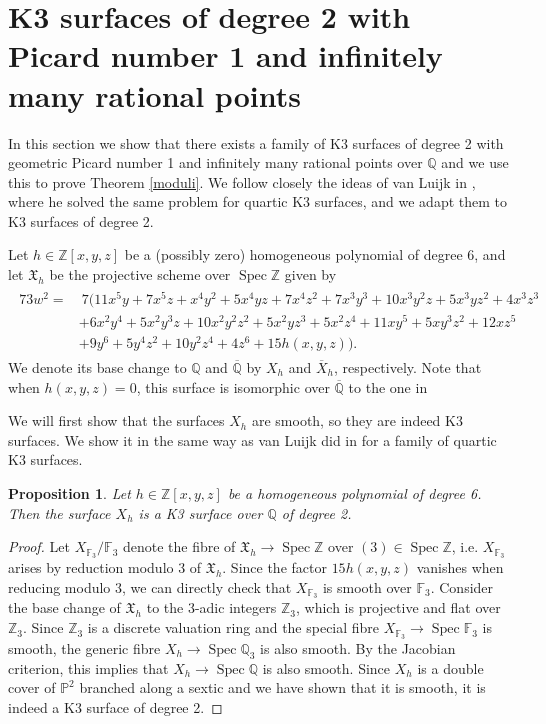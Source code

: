 \documentclass[11pt]{amsart}
\newcommand{\QQ}{\mathbb{Q}}
\newcommand{\ZZ}{\mathbb{Z}}
\newcommand{\PP}{\mathbb{P}}
\newcommand{\FF}{\mathbb{F}}
\theoremstyle{plain}
\newtheorem{proposition}[lemma]{Proposition}
\theoremstyle{remark}
\begin{document}
\section{K3 surfaces of degree 2 with Picard number 1 and infinitely many rational points} \label{thm2}

In this section we show that there exists a family of K3 surfaces of degree 2 with geometric Picard number 1 and infinitely many rational points over $\QQ$ and we use this to prove Theorem \ref{moduli}. We follow closely the ideas of van Luijk in \cite{vluijk}, where he solved the same problem for quartic K3 surfaces, and we adapt them to K3 surfaces of degree 2. 

Let $h\in\ZZ[x,y,z]$ be a (possibly zero) homogeneous polynomial of degree 6, and let $\mathfrak{X}_h$ be the projective scheme over $\operatorname{Spec}\ZZ$ given by 
\begin{align}\label{X_h}
\begin{split}
73w^2 = & \ 
 7(11x^5y+7x^5z+x^4y^2+5x^4yz+7x^4z^2+7x^3y^3+10x^3y^2z+5x^3yz^2+4x^3z^3 \\
& +6x^2y^4+5x^2y^3z+10x^2y^2z^2+5x^2yz^3+5x^2z^4+11xy^5+5xy^3z^2+12xz^5 \\
& +9y^6+5y^4z^2+10y^2z^4+4z^6+15h(x,y,z)).
\end{split}
\end{align}
We denote its base change to $\QQ$ and $\overline{\QQ}$ by $X_h$ and $\overline{X}_h$, respectively. Note that when $h(x,y,z)=0$, this surface is isomorphic over $\overline{\QQ}$ to the one in \cite[Corollary 30]{eljah}

We will first show that the surfaces $X_h$ are smooth, so they are indeed K3 surfaces. We show it in the same way as van Luijk did in \cite[Theorem 3.1]{vluijk} for a family of quartic K3 surfaces.

\begin{proposition} \label{XhK3}
    Let $h\in \ZZ[x,y,z]$ be a homogeneous polynomial of degree 6. Then the surface $X_h$ is a K3 surface over $\QQ$ of degree 2.
\end{proposition}
\begin{proof}
        Let $X_{\FF_3}/\FF_3$ denote the fibre of $\mathfrak{X}_h \rightarrow \operatorname{Spec} \ZZ$ over $(3)\in \operatorname{Spec} \ZZ$, i.e. $X_{\FF_3}$ arises by reduction modulo 3 of $\mathfrak{X}_h$. 
    Since the factor $15h(x,y,z)$ vanishes when reducing modulo 3, we can directly check that $X_{\FF_3}$ is smooth over $\FF_3$. Consider the base change of $\mathfrak{X}_h$ to the $3$-adic integers $\ZZ_3$, which is projective and flat over $\ZZ_3$. 
    Since $\ZZ_3$ is a discrete valuation ring and the special fibre $X_{\FF_3}\rightarrow \operatorname{Spec} \FF_3$ is smooth, the generic fibre 
    $X_h\rightarrow \operatorname{Spec}\QQ_3$ is also smooth. By the Jacobian criterion, this implies that $X_h\rightarrow \operatorname{Spec} \QQ$ is also smooth.
    Since $X_h$ is a double cover of $\PP^2$ branched along a sextic and we have shown that it is smooth, it is indeed a K3 surface of degree 2.
\end{proof}
\end{document}
